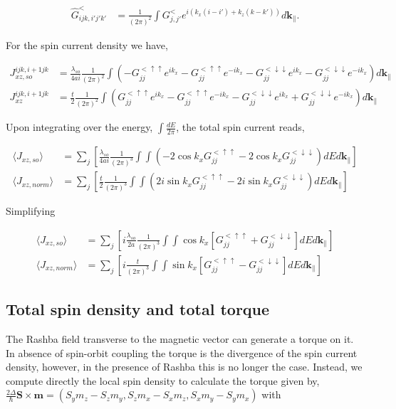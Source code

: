 \documentclass[10pt,prb,showpacs,amssymb,floatfix]{revtex4-1}
\newcommand{\dna}{\downarrow}
\newcommand{\nn}{\nonumber}
\newcommand{\para}{\parallel}
\newcommand{\upa}{\uparrow}
\newcommand{\Dlt}{\Delta}
\newcommand{\h}{\hat}
\begin{document}
\begin{align}
\h G^{<}_{ijk,i'j'k'} &= \frac{1}{(2\pi)^2} \int G_{j,j'}^{<} e^{i(k_x(i-i')+k_z(k-k'))} d\bm k_\para.
\end{align}

For the spin current density we have,

\begin{align}
J_{xz,so}^{ijk,i+1jk} &= \frac{\lambda_{so}}{4ai} \frac{1}{(2\pi)^2} \int  (-G_{jj}^{< \upa\upa} e^{ik_x}  - G_{jj}^{< \upa\upa} e^{-ik_x}  - G_{jj}^{< \dna\dna} e^{ik_x}   -  G_{jj}^{< \dna\dna} e^{-ik_x}) d\bm k_\para \nn\\
J_{xz}^{ijk,i+1jk} &= \frac{t}{2} \frac{1}{(2\pi)^2} \int(G_{jj}^{< \upa\upa} e^{ik_x}  - G_{jj}^{< \upa\upa} e^{-ik_x}  -   G_{jj}^{< \dna\dna} e^{ik_x}  +  G_{jj}^{< \dna\dna} e^{-ik_x} ) d\bm k_\para
\end{align}

Upon integrating over the energy, $\int \frac{dE}{2\pi}$, the total spin current reads,

\begin{align}
\langle J_{xz,so} \rangle &= \sum_ j [\frac{\lambda_{so}}{4ai} \frac{1}{(2\pi)^3}\int  \int  (- 2 \cos k_x G_{jj}^{< \upa\upa}    - 2 \cos k_x G_{jj}^{< \dna\dna} ) dE  d\bm k_\para] \nn\\
\langle J_{xz,norm} \rangle &= \sum_j [ \frac{t}{2} \frac{1}{(2\pi)^3}\int  \int( 2 i \sin k_x G_{jj}^{< \upa\upa}   -   2 i \sin k_x G_{jj}^{< \dna\dna}   ) dE  d\bm k_\para]
\end{align}

Simplifying

\begin{align}
\langle J_{xz,so} \rangle &= \sum_ j [i\frac{\lambda_{so}}{2a} \frac{1}{(2\pi)^3}\int  \int  \cos k_x [ G_{jj}^{< \upa\upa}    +  G_{jj}^{< \dna\dna}]  dE d\bm k_\para] \nn\\
\langle J_{xz,norm} \rangle &= \sum_j [  i\frac{t}{(2\pi)^3}\int  \int  \sin k_x [ G_{jj}^{< \upa\upa}   -   G_{jj}^{< \dna\dna}   ] dE d\bm k_\para]
\end{align}


\subsection{Total spin density and total torque}

The Rashba field transverse to the magnetic vector can generate a torque on it. In absence of spin-orbit coupling the torque is the divergence of the spin current density, however, in the presence of Rashba this is no longer the case. Instead, we compute directly the local spin density to calculate the torque given by, $\frac{2\Dlt}{\hbar} \bm S \times \bm m = (S_y m_z- S_z m_y , S_z m_x - S_x m_z, S_x m_y - S_y m_x)$ with
\end{document}
